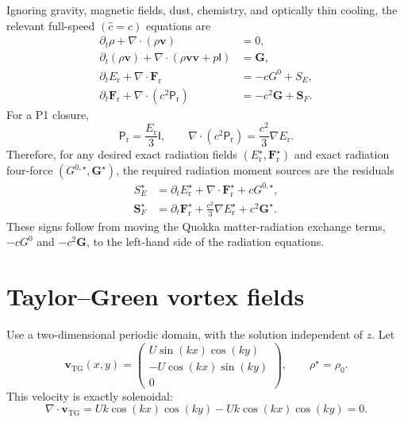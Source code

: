 \documentclass[11pt]{article}
\newcommand{\Div}{\nabla\!\cdot}
\newcommand{\Grad}{\nabla}
\newcommand{\Er}{E_{\mathrm r}}
\newcommand{\Fr}{\bm{F}_{\mathrm r}}
\newcommand{\Prad}{\mathsf{P}_{\mathrm r}}
\newcommand{\Gmom}{\bm{G}}
\newcommand{\Gzero}{G^0}
\newcommand{\ShatE}{S_E}
\newcommand{\ShatF}{\bm{S}_F}
\newcommand{\chat}{\hat{c}}
\begin{document}
Ignoring gravity, magnetic fields, dust, chemistry, and optically thin cooling,
the relevant full-speed \((\chat=c)\) equations are
\begin{align}
  \partial_t \rho + \Div(\rho \bm{v}) &= 0, \label{eq:mass}\\
  \partial_t(\rho \bm{v}) + \Div(\rho \bm{v}\bm{v} + p\mathsf{I}) &= \Gmom, \label{eq:mom}\\
  \partial_t \Er + \Div \Fr &= -c\Gzero + \ShatE, \label{eq:rad-energy}\\
  \partial_t \Fr + \Div(c^2\Prad) &= -c^2\Gmom + \ShatF. \label{eq:rad-flux}
\end{align}
For a P1 closure,
\begin{equation}
  \Prad = \frac{\Er}{3}\mathsf{I},
  \qquad
  \Div(c^2\Prad) = \frac{c^2}{3}\Grad \Er.
  \label{eq:p1}
\end{equation}
Therefore, for any desired exact radiation fields
\((\Er^\star,\Fr^\star)\) and exact radiation four-force
\((G^{0,\star},\Gmom^\star)\), the required radiation moment sources are the
residuals
\begin{align}
  \ShatE^\star
    &= \partial_t \Er^\star + \Div \Fr^\star + cG^{0,\star},
    \label{eq:general-energy-source}\\
  \ShatF^\star
    &= \partial_t \Fr^\star + \frac{c^2}{3}\Grad \Er^\star
       + c^2\Gmom^\star.
    \label{eq:general-flux-source}
\end{align}
These signs follow from moving the Quokka matter-radiation exchange terms,
\(-c\Gzero\) and \(-c^2\Gmom\), to the left-hand side of the radiation
equations.

\section{Taylor--Green vortex fields}

Use a two-dimensional periodic domain, with the solution independent of \(z\).
Let
\begin{equation}
  \bm{v}_{\mathrm{TG}}(x,y)
  =
  \begin{pmatrix}
    U\sin(kx)\cos(ky)\\
   -U\cos(kx)\sin(ky)\\
    0
  \end{pmatrix},
  \qquad
  \rho^\star = \rho_0.
  \label{eq:tgv}
\end{equation}
This velocity is exactly solenoidal:
\begin{equation}
  \Div \bm{v}_{\mathrm{TG}}
  = Uk\cos(kx)\cos(ky) - Uk\cos(kx)\cos(ky) = 0.
  \label{eq:tgv-divergence}
\end{equation}
\end{document}
